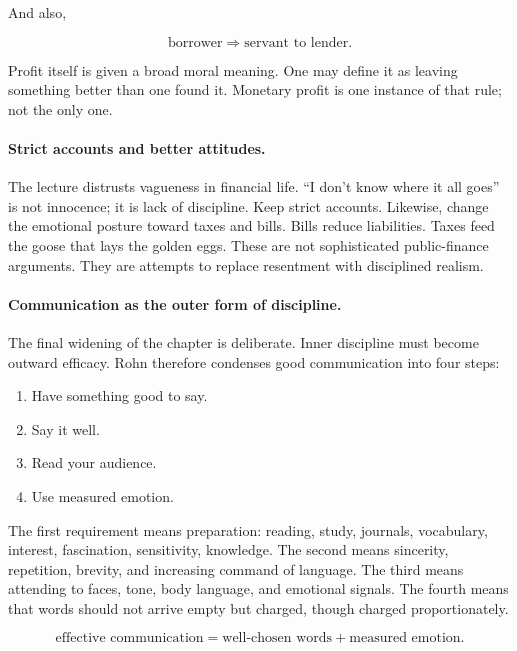 And also,

\begin{equation}
\text{borrower}\Rightarrow \text{servant to lender}.
\end{equation}

Profit itself is given a broad moral meaning. One may define it as leaving something better than one found it. Monetary profit is one instance of that rule; not the only one.

\paragraph{Strict accounts and better attitudes.}
The lecture distrusts vagueness in financial life. ``I don't know where it all goes'' is not innocence; it is lack of discipline. Keep strict accounts. Likewise, change the emotional posture toward taxes and bills. Bills reduce liabilities. Taxes feed the goose that lays the golden eggs. These are not sophisticated public-finance arguments. They are attempts to replace resentment with disciplined realism.

\paragraph{Communication as the outer form of discipline.}
The final widening of the chapter is deliberate. Inner discipline must become outward efficacy. Rohn therefore condenses good communication into four steps:

\begin{enumerate}
\item Have something good to say.
\item Say it well.
\item Read your audience.
\item Use measured emotion.
\end{enumerate}

The first requirement means preparation: reading, study, journals, vocabulary, interest, fascination, sensitivity, knowledge. The second means sincerity, repetition, brevity, and increasing command of language. The third means attending to faces, tone, body language, and emotional signals. The fourth means that words should not arrive empty but charged, though charged proportionately.

\begin{equation}
\text{effective communication}
=
\text{well-chosen words}
+
\text{measured emotion}.
\end{equation}

